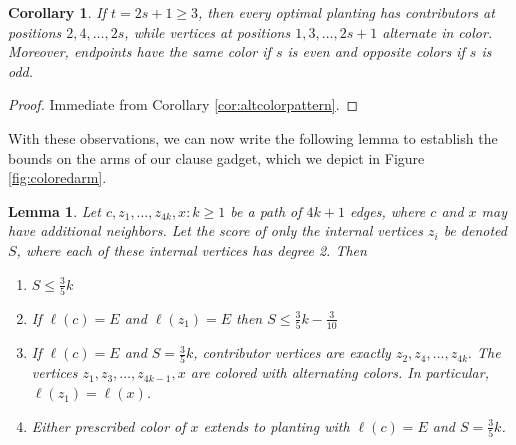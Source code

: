 \documentclass[11pt]{article}
\theoremstyle{plain}
\newtheorem{lemma}[theorem]{Lemma}
\newtheorem{corollary}[theorem]{Corollary}
\begin{document}
\begin{corollary} \label{cor:optplantingevenemptoddcolor}
     If $t=2s+1 \geq 3$, then every optimal planting has contributors at positions $2, 4, \dots, 2s$, while vertices at positions $1, 3, \dots, 2s+1$ alternate in color. Moreover, endpoints have the same color if $s$ is even and opposite colors if $s$ is odd. 
\end{corollary}

\begin{proof}
    Immediate from Corollary \ref{cor:altcolorpattern}.
\end{proof}

With these observations, we can now write the following lemma to establish the bounds on the arms of our clause gadget, which we depict in Figure \ref{fig:coloredarm}.

\begin{lemma} \label{lem:armlemmas}
    Let $c, z_1, \dots, z_{4k}, x:k \geq 1$ be a path of $4k+1$ edges, where $c$ and $x$ may have additional neighbors. Let the score of only the internal vertices $z_i$ be denoted $S$, where each of these internal vertices has degree 2. Then
    \begin{enumerate}
        \item $S \leq \frac{3}{5} k$
        \item If $\ell(c)=E$ and $\ell(z_1)=E$ then $S \leq \frac{3}{5}k-\frac{3}{10}$
        \item If $\ell(c) = E$ and $S = \frac{3}{5}k$, contributor vertices are exactly $z_2,z_4, \dots, z_{4k}.$ The vertices $z_1,z_3,\ldots,z_{4k-1},x$ are colored with alternating colors. In particular, $\ell(z_1) = \ell(x)$.
        \item Either prescribed color of $x$ extends to planting with $\ell(c) = E$ and $S = \frac{3}{5}k$.
    \end{enumerate}
\end{lemma}
\end{document}
